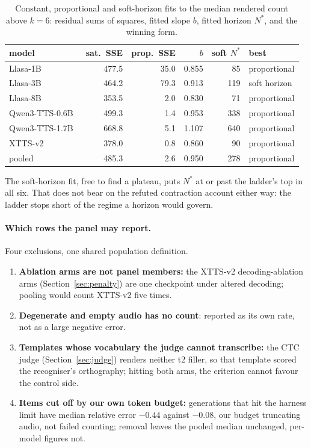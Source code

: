 \begin{table}[tp]\centering
\caption{Constant, proportional and soft-horizon fits to the median rendered count above $k=6$: residual sums of squares, fitted slope $b$, fitted horizon $N^\ast$, and the winning form.}
\label{tab:satfits}
\begin{tabular}{lrrrrl}
\toprule
model & sat.\ SSE & prop.\ SSE & $b$ & soft $N^\ast$ & best \\
\midrule
Llasa-1B~\cite{ye2025llasa} & 477.5 & 35.0 & 0.855 & 85 & proportional \\
Llasa-3B & 464.2 & 79.3 & 0.913 & 119 & soft horizon \\
Llasa-8B & 353.5 & 2.0 & 0.830 & 71 & proportional \\
Qwen3-TTS-0.6B~\cite{hu2026qwen3tts} & 499.3 & 1.4 & 0.953 & 338 & proportional \\
Qwen3-TTS-1.7B & 668.8 & 5.1 & 1.107 & 640 & proportional \\
XTTS-v2~\cite{casanova2024xtts} & 378.0 & 0.8 & 0.860 & 90 & proportional \\
\midrule
pooled & 485.3 & 2.6 & 0.950 & 278 & proportional \\
\bottomrule
\end{tabular}
\end{table}

\noindent The soft-horizon fit, free to find a plateau, puts $N^\ast$ at or past the ladder's
top in all six. That does not bear on the refuted contraction account either way: the
ladder stops short of the regime a horizon would govern.

\paragraph{Which rows the panel may report.} Four exclusions, one shared population definition.

\begin{enumerate}
\item \textbf{Ablation arms are not panel members:} the XTTS-v2 decoding-ablation arms
(Section~\ref{sec:penalty}) are one checkpoint under altered decoding; pooling would count XTTS-v2
five times.
\item \textbf{Degenerate and empty audio has no count}: reported as its own rate, not as a large
negative error.
\item \textbf{Templates whose vocabulary the judge cannot transcribe:} the CTC judge
(Section~\ref{sec:judge}) renders neither t2 filler, so that template scored the recogniser's
orthography; hitting both arms, the criterion cannot favour the control side.
\item \textbf{Items cut off by our own token budget:} generations that hit the harness limit have
median relative error $-0.44$ against $-0.08$, our budget truncating audio, not failed counting;
removal leaves the pooled median unchanged, per-model figures not.
\end{enumerate}

